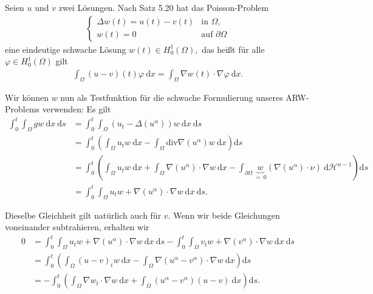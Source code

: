 \begin{solution}

\phantom{}
Seien $u$ und $v$ zwei Lösungen. Nach Satz 5.20 hat das Poisson-Problem
\begin{align}\label{poisson}
\begin{cases}
\Delta w(t) = u(t) - v(t) &\text{in~} \Omega,\\
w(t) = 0 &\text{auf~} \partial\Omega
\end{cases}
\end{align}
eine eindeutige schwache Lösung $w(t) \in H_0^1(\Omega),$ das heißt für alle $\varphi \in H_0^1(\Omega)$ gilt
\begin{align}\label{schwach}
    \int_\Omega (u-v)(t) \varphi \mathrm{~d}x = \int_\Omega \nabla w(t) \cdot \nabla \varphi \mathrm{~d}x.
\end{align}

Wir können $w$ nun als Testfunktion für die schwache Formulierung unseres ARW-Problems verwenden: Es gilt
\begin{align*}
    \int_0^t \int_\Omega gw \mathrm{~d}x \mathrm{~d}s
    &= \int_0^t \int_\Omega \left(u_t - \Delta(u^\alpha)\right) w \mathrm{~d}x \mathrm{~d}s \\
    &= \int_0^t \left(\int_\Omega u_t w \mathrm{~d}x - \int_\Omega \mathrm{div}\nabla(u^\alpha) w \mathrm{~d}x\right) \mathrm{d}s\\
    &= \int_0^t \left(\int_\Omega u_t w \mathrm{~d}x + \int_\Omega \nabla(u^\alpha) \cdot \nabla w \mathrm{~d}x - \int_{\partial\Omega} \underbrace{w}_{=~0}(\nabla(u^\alpha)\cdot\nu) \mathrm{~d}\mathcal{H}^{n-1}\right) \mathrm{d}s\\
    &= \int_0^t \int_\Omega u_t w + \nabla(u^\alpha) \cdot \nabla w \mathrm{~d}x \mathrm{~d}s.
\end{align*}

Dieselbe Gleichheit gilt natürlich auch für $v.$ Wenn wir beide Gleichungen voneinander subtrahieren, erhalten wir
\begin{align*}
    0 &= \int_0^t \int_\Omega u_t w + \nabla(u^\alpha) \cdot \nabla w \mathrm{~d}x \mathrm{~d}s - \int_0^t \int_\Omega v_t w + \nabla(v^\alpha) \cdot \nabla w \mathrm{~d}x \mathrm{~d}s\\
    &= \int_0^t \left(\int_\Omega (u-v)_t w \mathrm{~d}x - \int_\Omega \nabla(u^\alpha - v^\alpha) \cdot \nabla w \mathrm{~d}x\right) \mathrm{d}s\\
    &= - \int_0^t \left(\int_\Omega \nabla w_t \cdot \nabla w \mathrm{~d}x + \int_\Omega (u^\alpha - v^\alpha) (u-v) \mathrm{~d}x\right)\mathrm{d}s.
\end{align*}


\end{solution}
